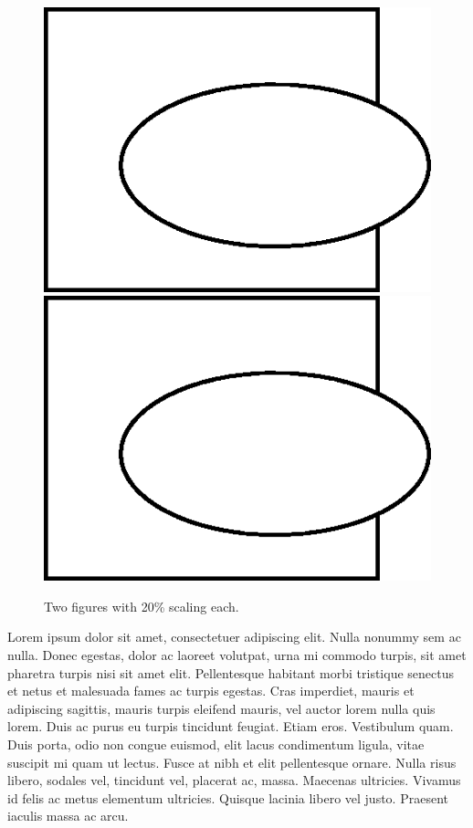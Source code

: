 \documentclass{article}
\begin{document}
\begin{figure}
\begin{center}
\includegraphics[scale=0.2]{fig_oval.png}
\includegraphics[scale=0.2]{fig_oval.png}
\end{center}
\caption{Two figures with 20\% scaling each.} 
\end{figure}

Lorem ipsum dolor sit amet, consectetuer adipiscing elit. Nulla nonummy sem ac nulla. Donec egestas, dolor ac laoreet volutpat, urna mi commodo turpis, sit amet pharetra turpis nisi sit amet elit. Pellentesque habitant morbi tristique senectus et netus et malesuada fames ac turpis egestas. Cras imperdiet, mauris et adipiscing sagittis, mauris turpis eleifend mauris, vel auctor lorem nulla quis lorem. Duis ac purus eu turpis tincidunt feugiat. Etiam eros. Vestibulum quam. Duis porta, odio non congue euismod, elit lacus condimentum ligula, vitae suscipit mi quam ut lectus. Fusce at nibh et elit pellentesque ornare. Nulla risus libero, sodales vel, tincidunt vel, placerat ac, massa. Maecenas ultricies. Vivamus id felis ac metus elementum ultricies. Quisque lacinia libero vel justo. Praesent iaculis massa ac arcu.
\end{document}
